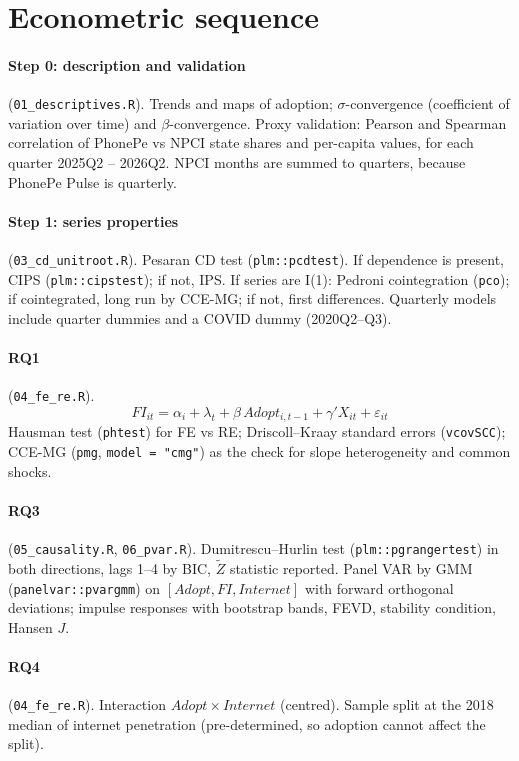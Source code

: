 \documentclass[11pt,a4paper]{article}
\begin{document}
\section{Econometric sequence}

\paragraph{Step 0: description and validation} (\texttt{01\_descriptives.R}). Trends and maps of
adoption; $\sigma$-convergence (coefficient of variation over time) and $\beta$-convergence.
Proxy validation: Pearson and Spearman correlation of PhonePe vs NPCI state shares and per-capita
values, for each quarter 2025Q2 -- 2026Q2. NPCI months are summed to quarters, because PhonePe Pulse is
quarterly.

\paragraph{Step 1: series properties} (\texttt{03\_cd\_unitroot.R}). Pesaran CD test
(\texttt{plm::pcdtest}). If dependence is present, CIPS (\texttt{plm::cipstest}); if not, IPS.
If series are I(1): Pedroni cointegration (\texttt{pco}); if cointegrated, long run by CCE-MG;
if not, first differences. Quarterly models include quarter dummies and a COVID dummy (2020Q2--Q3).

\paragraph{RQ1} (\texttt{04\_fe\_re.R}).
\[
FI_{it} = \alpha_i + \lambda_t + \beta\, Adopt_{i,t-1} + \gamma' X_{it} + \varepsilon_{it}
\]
Hausman test (\texttt{phtest}) for FE vs RE; Driscoll--Kraay standard errors (\texttt{vcovSCC});
CCE-MG (\texttt{pmg}, \texttt{model = "cmg"}) as the check for slope heterogeneity and common shocks.

\paragraph{RQ3} (\texttt{05\_causality.R}, \texttt{06\_pvar.R}). Dumitrescu--Hurlin test
(\texttt{plm::pgrangertest}) in both directions, lags 1--4 by BIC, $\tilde{Z}$ statistic reported.
Panel VAR by GMM (\texttt{panelvar::pvargmm}) on $[Adopt, FI, Internet]$ with forward orthogonal
deviations; impulse responses with bootstrap bands, FEVD, stability condition, Hansen $J$.

\paragraph{RQ4} (\texttt{04\_fe\_re.R}). Interaction $Adopt \times Internet$ (centred). Sample split at
the 2018 median of internet penetration (pre-determined, so adoption cannot affect the split).
\end{document}
